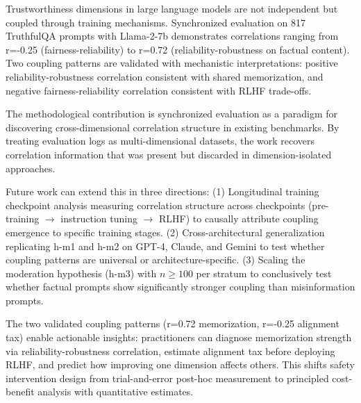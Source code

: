 
Trustworthiness dimensions in large language models are not independent but coupled through training mechanisms. Synchronized evaluation on 817 TruthfulQA prompts with Llama-2-7b demonstrates correlations ranging from r=-0.25 (fairness-reliability) to r=0.72 (reliability-robustness on factual content). Two coupling patterns are validated with mechanistic interpretations: positive reliability-robustness correlation consistent with shared memorization, and negative fairness-reliability correlation consistent with RLHF trade-offs.

The methodological contribution is synchronized evaluation as a paradigm for discovering cross-dimensional correlation structure in existing benchmarks. By treating evaluation logs as multi-dimensional datasets, the work recovers correlation information that was present but discarded in dimension-isolated approaches.

Future work can extend this in three directions: (1) Longitudinal training checkpoint analysis measuring correlation structure across checkpoints (pre-training $\rightarrow$ instruction tuning $\rightarrow$ RLHF) to causally attribute coupling emergence to specific training stages. (2) Cross-architectural generalization replicating h-m1 and h-m2 on GPT-4, Claude, and Gemini to test whether coupling patterns are universal or architecture-specific. (3) Scaling the moderation hypothesis (h-m3) with $n\geq 100$ per stratum to conclusively test whether factual prompts show significantly stronger coupling than misinformation prompts.

The two validated coupling patterns (r=0.72 memorization, r=-0.25 alignment tax) enable actionable insights: practitioners can diagnose memorization strength via reliability-robustness correlation, estimate alignment tax before deploying RLHF, and predict how improving one dimension affects others. This shifts safety intervention design from trial-and-error post-hoc measurement to principled cost-benefit analysis with quantitative estimates.
